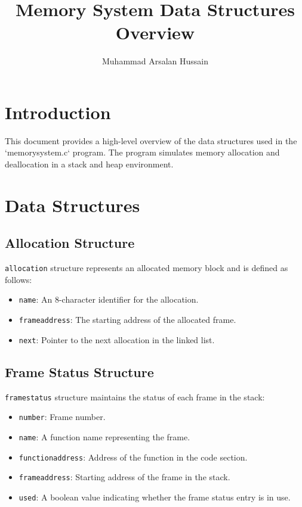 \documentclass{article}
\title{Memory System Data Structures Overview}
\author{Muhammad Arsalan Hussain}
\begin{document}
\maketitle

\section*{Introduction}
This document provides a high-level overview of the data structures used in the `memorysystem.c` program. The program simulates memory allocation and deallocation in a stack and heap environment.

\section*{Data Structures}

\subsection*{Allocation Structure}
\texttt{allocation} structure represents an allocated memory block and is defined as follows:
\begin{itemize}
    \item \texttt{name}: An 8-character identifier for the allocation.
    \item \texttt{frameaddress}: The starting address of the allocated frame.
    \item \texttt{next}: Pointer to the next allocation in the linked list.
\end{itemize}

\subsection*{Frame Status Structure}
\texttt{framestatus} structure maintains the status of each frame in the stack:
\begin{itemize}
    \item \texttt{number}: Frame number.
    \item \texttt{name}: A function name representing the frame.
    \item \texttt{functionaddress}: Address of the function in the code section.
    \item \texttt{frameaddress}: Starting address of the frame in the stack.
    \item \texttt{used}: A boolean value indicating whether the frame status entry is in use.
\end{itemize}
\end{document}
